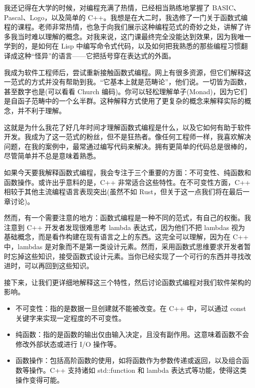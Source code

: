 
我还记得在大学的时候，对编程充满了热情，已经相当熟练地掌握了 BASIC、Pascal、Logo，以及简单的 C++。我想是在大二时，我选修了一门关于函数式编程的课程。老师非常热情，也急于向我们展示这种编程范式的奇妙之处，讲解了许多我当时难以理解的概念。对我来说，这门课最终完全没能达到效果，因为我唯一学到的，是如何在 Lisp 中编写命令式代码，以及如何把我熟悉的那些编程习惯翻译成这种“怪异”的语言——它把括号穿在表达式的外面。

我成为软件工程师后，尝试重新接触函数式编程。网上有很多资源，但它们解释这一范式的方式并没有帮助到我。“它基本上就是范畴论”，他们说。一切皆为函数，甚至数字也是(可以看看 Church 编码)。你可以轻松理解单子(Monad)，因为它们是自函子范畴中的一个幺半群。这种解释方式使用了更复杂的概念来解释实际的概念，并不利于理解。

这就是为什么我花了好几年时间才理解函数式编程是什么，以及它如何有助于软件开发。我成为了这一范式的粉丝，但不是狂热者。像任何工程师一样，我喜欢解决问题，在我的案例中，最常通过编写代码来解决。拥有更简单的代码总是很棒的，尽管简单并不总是意味着熟悉。

如果今天要我解释函数式编程，我会专注于三个重要的方面：不可变性、纯函数和函数操作。或许出乎意料的是，C++ 非常适合这些特性。在不可变性方面，C++ 相较于其他主流编程语言表现突出(虽然不如 Rust，但关于这一点我们将在最后一章讨论)。

然而，有一个需要注意的地方：函数式编程是一种不同的范式，有自己的权衡。我注意到 C++ 开发者发现很难思考 lambda 表达式，因为他们不把 lambdas 视为基础概念，而是看作构建在现有语言之上的东西。这完全可以理解，因为在 C++ 中，lambdas 是对象而不是第一类设计元素。然而，采用函数式思维要求开发者暂时忘掉这些知识，接受函数式设计元素。当你已经实现了一个可行的东西并寻找改进时，可以再回到这些知识。

接下来，让我们更详细地解释这三个特性，然后讨论函数式编程对我们软件架构的影响。 

\begin{itemize}
\item 
不可变性：指的是数据一旦创建就不能被改变。在 C++ 中，可以通过 const 关键字来实现一定程度的不可变性。

\item 
纯函数：指的是函数的输出仅由输入决定，且没有副作用。这意味着函数不会修改外部状态或进行 I/O 操作等。

\item 
函数操作：包括高阶函数的使用，如将函数作为参数传递或返回，以及组合函数等操作。C++ 支持诸如 std::function 和 lambda 表达式等功能，使得这类操作变得可能。 
\end{itemize}


